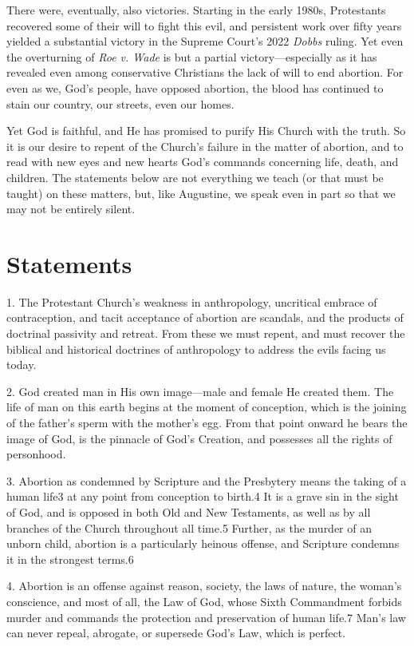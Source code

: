 \documentclass[
]{book}
\begin{document}
There were, eventually, also victories. Starting in the early 1980s, Protestants recovered some of their will to fight this evil, and persistent work over fifty years yielded a substantial victory in the Supreme Court's 2022 \emph{Dobbs} ruling. Yet even the overturning of \emph{Roe v. Wade} is but a partial victory---especially as it has revealed even among conservative Christians the lack of will to end abortion. For even as we, God's people, have opposed abortion, the blood has continued to stain our country, our streets, even our homes.

Yet God is faithful, and He has promised to purify His Church with the truth. So it is our desire to repent of the Church's failure in the matter of abortion, and to read with new eyes and new hearts God's commands concerning life, death, and children. The statements below are not everything we teach (or that must be taught) on these matters, but, like Augustine, we speak even in part so that we may not be entirely silent.

\hypertarget{statements}{%
\section*{Statements}\label{statements}}

1. The Protestant Church's weakness in anthropology, uncritical embrace of contraception, and tacit acceptance of abortion are scandals, and the products of doctrinal passivity and retreat. From these we must repent, and must recover the biblical and historical doctrines of anthropology to address the evils facing us today.

2. God created man in His own image---male and female He created them. The life of man on this earth begins at the moment of conception, which is the joining of the father's sperm with the mother's egg. From that point onward he bears the image of God, is the pinnacle of God's Creation, and possesses all the rights of personhood.

3. Abortion as condemned by Scripture and the Presbytery means the taking of a human life3 at any point from conception to birth.4 It is a grave sin in the sight of God, and is opposed in both Old and New Testaments, as well as by all branches of the Church throughout all time.5 Further, as the murder of an unborn child, abortion is a particularly heinous offense, and Scripture condemns it in the strongest terms.6

4. Abortion is an offense against reason, society, the laws of nature, the woman's conscience, and most of all, the Law of God, whose Sixth Commandment forbids murder and commands the protection and preservation of human life.7 Man's law can never repeal, abrogate, or supersede God's Law, which is perfect.
\end{document}
